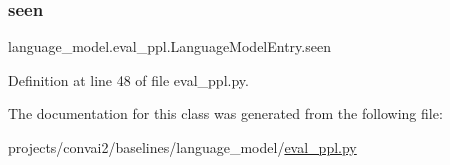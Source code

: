 \subsubsection{\texorpdfstring{seen}{seen}}
{\footnotesize\ttfamily language\+\_\+model.\+eval\+\_\+ppl.\+Language\+Model\+Entry.\+seen}



Definition at line 48 of file eval\+\_\+ppl.\+py.



The documentation for this class was generated from the following file\+:\begin{DoxyCompactItemize}
\item 
projects/convai2/baselines/language\+\_\+model/\hyperlink{projects_2convai2_2baselines_2language__model_2eval__ppl_8py}{eval\+\_\+ppl.\+py}\end{DoxyCompactItemize}
